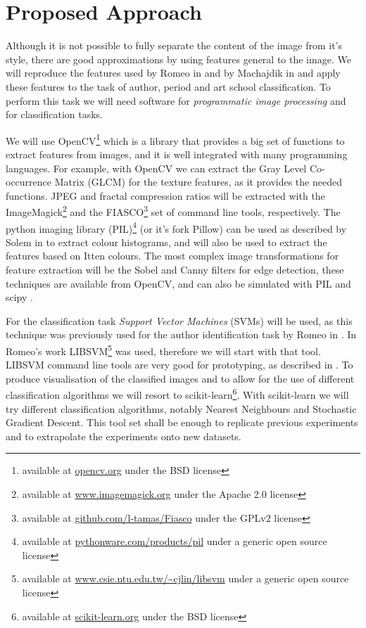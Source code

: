 \documentclass[a4paper,twocolumn]{article}
\begin{document}

\section{Proposed Approach}

Although it is not possible to fully separate the content of the image from
it's style, there are good approximations by using features general to the
image.  We will reproduce the features used by Romeo in \cite{rmc12ajs} and by
Machajdik in \cite{mach10clas} and apply these features to the task of author,
period and art school classification.  To perform this task we will need
software for \emph{programmatic image processing} and for classification tasks.

We will use OpenCV\footnote{available at \href{http://opencv.org/}{opencv.org}
under the BSD license} which is a library that provides a big set of functions
to extract features from images, and it is well integrated with many
programming languages.  For example, with OpenCV we can extract the Gray Level
Co-occurrence Matrix (GLCM) for the texture features, as it provides the needed
functions.  JPEG and fractal compression ratios will be extracted with the
ImageMagick\footnote{available at
\href{http://www.imagemagick.org/}{www.imagemagick.org} under the Apache 2.0
license} and the FIASCO\footnote{available at
\href{http://github.com/l-tamas/Fiasco/}{github.com/l-tamas/Fiasco} under the
GPLv2 license} set of command line tools, respectively.  The python imaging
library (PIL)\footnote{available at
\href{http://pythonware.com/products/pil/}{pythonware.com/products/pil} under a
generic open source license} (or it's fork Pillow) can be used as described by
Solem in \cite{solem12book} to extract colour histograms, and will also be used
to extract the features based on Itten colours.  The most complex image
transformations for feature extraction will be the Sobel and Canny filters for
edge detection, these techniques are available from OpenCV, and can also be
simulated with PIL and scipy \cite{oliphant06numpy}.

For the classification task \emph{Support Vector Machines} (SVMs) will be used,
as this technique was previously used for the author identification task by
Romeo in \cite{rmc12ajs}.  In Romeo's work LIBSVM\footnote{available at
\href{http://www.csie.ntu.edu.tw/~cjlin/libsvm/}
{www.csie.ntu.edu.tw/\~{}cjlin/libsvm} under a generic open source license} was
used, therefore we will start with that tool.  LIBSVM command line tools are
very good for prototyping, as described in \cite{hcl03svm}.  To produce
visualisation of the classified images and to allow for the use of different
classification algorithms we will resort to scikit-learn\footnote{available at
\href{http://scikit-learn.org/}{scikit-learn.org} under the BSD license}.  With
scikit-learn we will try different classification algorithms, notably Nearest
Neighbours and Stochastic Gradient Descent.  This tool set shall be enough to
replicate previous experiments and to extrapolate the experiments onto new
datasets.
\end{document}
